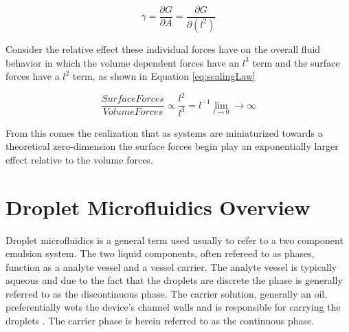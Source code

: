 \begin{equation}
\gamma = \frac{\partial G}{\partial A} = \frac{\partial G}{\partial (l^2)}
\label{eq:interfacial}
\end{equation}


Consider the relative effect these individual forces have on the overall fluid behavior in which the volume dependent forces have an $l^3$ term and the surface forces have a $l^2$ term, as shown in Equation \vref{eq:scalingLaw} \cite{Bruus2008}

\begin{equation}
\frac{Surface Forces}{Volume Forces} \propto \frac{l^2}{l^3} = l^{-1} \lim_{l \to 0}  \rightarrow \infty
\label{eq:scalingLaw}
\end{equation}

From this comes the realization that as systems are miniaturized towards a theoretical zero-dimension the surface forces begin play an exponentially larger effect relative to the volume forces.



\section{Droplet Microfluidics Overview}

Droplet microfluidics is a general term used usually to refer to a two component emulsion system. The two liquid components, often refereed to as phases, function as a analyte vessel and a vessel carrier. The analyte vessel is typically aqueous and due to the fact that the droplets are discrete the phase is generally referred to as the discontinuous phase. The carrier solution, generally an oil, preferentially wets the device's channel walls and is responsible for carrying the droplets \cite{Kaminski2016}. The carrier phase is herein referred to as the continuous phase. 

